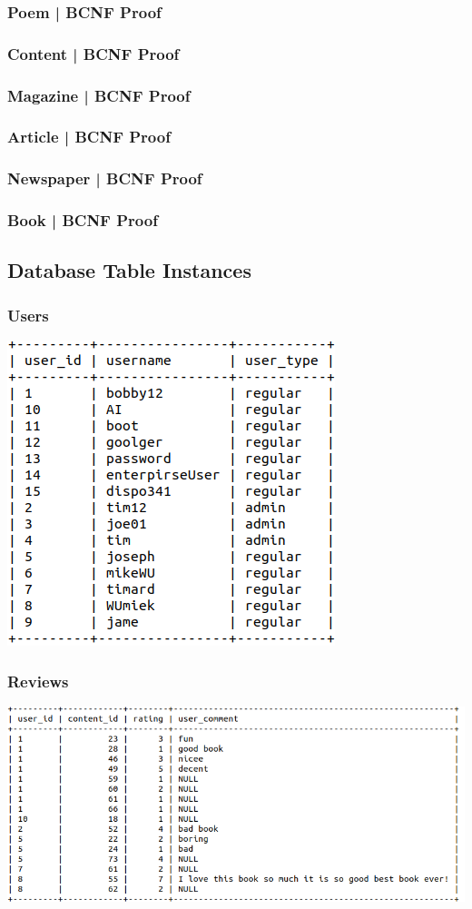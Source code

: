 \documentclass[letter, 12pt, titlepage]{article}
\begin{document}
		\subsubsection{Poem | BCNF Proof }
		\subsubsection{Content | BCNF Proof }
		\subsubsection{Magazine | BCNF Proof }
		\subsubsection{Article | BCNF Proof }
		\subsubsection{Newspaper | BCNF Proof }
		\subsubsection{Book | BCNF Proof }
	
\subsection{Database Table Instances}
		\subsubsection{Users}
			\includegraphics[scale=.5]{users.png}
		\subsubsection{Reviews}
			\includegraphics[scale=.5]{reviews.png}
\end{document}
